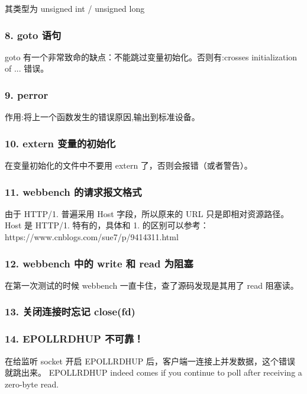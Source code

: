其类型为 unsigned int / unsigned long

\subsubsection*{8. goto 语句}

goto 有一个非常致命的缺点：不能跳过变量初始化。否则有\+:crosses initialization of ... 错误。

\subsubsection*{9. perror}

作用\+:将上一个函数发生的错误原因,输出到标准设备。

\subsubsection*{10. extern 变量的初始化}

在变量初始化的文件中不要用 extern 了，否则会报错（或者警告）。

\subsubsection*{11. webbench 的请求报文格式}

由于 H\+T\+T\+P/1. 普遍采用 Host 字段，所以原来的 U\+RL 只是即相对资源路径。~\newline
 Host 是 H\+T\+T\+P/1. 特有的，具体和 1. 的区别可以参考：https\+://www.cnblogs.\+com/sue7/p/9414311.html

\subsubsection*{12. webbench 中的 write 和 read 为阻塞}

在第一次测试的时候 webbench 一直卡住，查了源码发现是其用了 read 阻塞读。

\subsubsection*{13. 关闭连接时忘记 close(fd)}

\subsubsection*{14. E\+P\+O\+L\+L\+R\+D\+H\+UP 不可靠！}

在给监听 socket 开启 E\+P\+O\+L\+L\+R\+D\+H\+UP 后，客户端一连接上并发数据，这个错误就跳出来。 E\+P\+O\+L\+L\+R\+D\+H\+UP indeed comes if you continue to poll after receiving a zero-\/byte read.

